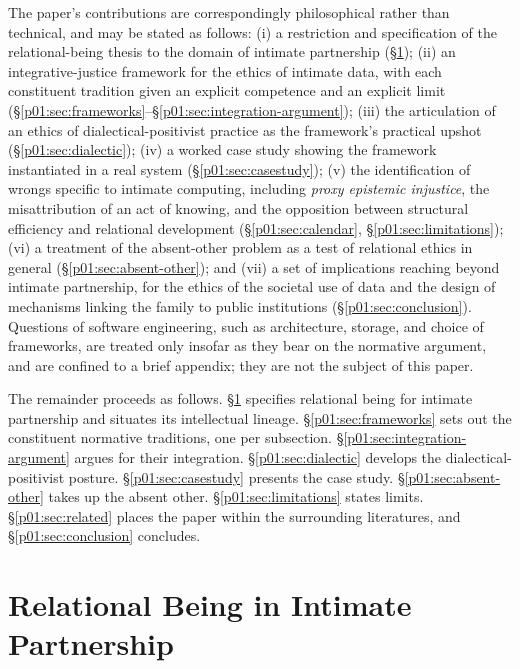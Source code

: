 The paper's contributions are correspondingly philosophical rather than technical, and may be stated as follows: (i) a restriction and specification of the relational-being thesis to the domain of intimate partnership (§\ref{p01:sec:relational-being}); (ii) an integrative-justice framework for the ethics of intimate data, with each constituent tradition given an explicit competence and an explicit limit (§\ref{p01:sec:frameworks}--§\ref{p01:sec:integration-argument}); (iii) the articulation of an ethics of dialectical-positivist practice as the framework's practical upshot (§\ref{p01:sec:dialectic}); (iv) a worked case study showing the framework instantiated in a real system (§\ref{p01:sec:casestudy}); (v) the identification of wrongs specific to intimate computing, including \emph{proxy epistemic injustice}, the misattribution of an act of knowing, and the opposition between structural efficiency and relational development (§\ref{p01:sec:calendar}, §\ref{p01:sec:limitations}); (vi) a treatment of the absent-other problem as a test of relational ethics in general (§\ref{p01:sec:absent-other}); and (vii) a set of implications reaching beyond intimate partnership, for the ethics of the societal use of data and the design of mechanisms linking the family to public institutions (§\ref{p01:sec:conclusion}). Questions of software engineering, such as architecture, storage, and choice of frameworks, are treated only insofar as they bear on the normative argument, and are confined to a brief appendix; they are not the subject of this paper.

The remainder proceeds as follows. §\ref{p01:sec:relational-being} specifies relational being for intimate partnership and situates its intellectual lineage. §\ref{p01:sec:frameworks} sets out the constituent normative traditions, one per subsection. §\ref{p01:sec:integration-argument} argues for their integration. §\ref{p01:sec:dialectic} develops the dialectical-positivist posture. §\ref{p01:sec:casestudy} presents the case study. §\ref{p01:sec:absent-other} takes up the absent other. §\ref{p01:sec:limitations} states limits. §\ref{p01:sec:related} places the paper within the surrounding literatures, and §\ref{p01:sec:conclusion} concludes.

\section{Relational Being in Intimate Partnership}\label{p01:sec:relational-being}

